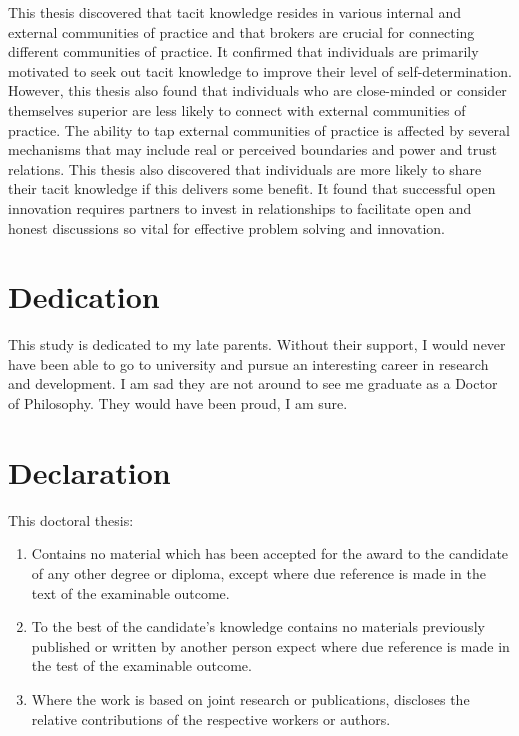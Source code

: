 \documentclass[12pt,table]{book}
\begin{document}
\noindent
This thesis discovered that tacit knowledge resides in various internal and external communities of practice and that brokers are crucial for connecting different communities of practice. It confirmed that individuals are primarily motivated to seek out tacit knowledge to improve their level of self-determination. However, this thesis also found that individuals who are close-minded or consider themselves superior are less likely to connect with external communities of practice. The ability to tap external communities of practice is affected by several mechanisms that may include real or perceived boundaries and power and trust relations. This thesis also discovered that individuals are more likely to share their tacit knowledge if this delivers some benefit. It found that successful open innovation requires partners to invest in relationships to facilitate open and honest discussions so vital for effective problem solving and innovation.

\chapter*{Dedication}

This study is dedicated to my late parents. Without their support, I would never have been able to go to university and pursue an interesting career in research and development. I am sad they are not around to see me graduate as a Doctor of Philosophy. They would have been proud, I am sure.

\chapter*{Declaration}

This doctoral thesis:

\begin{enumerate}
    \item Contains no material which has been accepted for the award to the candidate of any other degree or diploma, except where due reference is made in the text of the examinable outcome.
    \item To the best of the candidate’s knowledge contains no materials previously published or written by another person expect where due reference is made in the test of the examinable outcome.
    \item Where the work is based on joint research or publications, discloses the relative contributions of the respective workers or authors.
\end{enumerate} \bigskip
\end{document}

